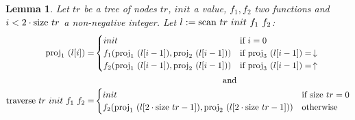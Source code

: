 \documentclass{article}
\newtheorem{lemma}{Lemma}
\newcommand{\textfun}[1]{\textup{#1}}
\newcommand{\longtraverse}[4]{\textfun{traverse}\ #1\ #2\ #3 \ #4}
\newcommand{\longscan}[4]{\textfun{scan}\ #1\ #2\ #3 \ #4}
\newcommand{\up}{\uparrow}
\newcommand{\down}{\downarrow}
\newcommand{\size}[1]{\textfun{size}\ #1}
\newcommand{\fst}[1]{\textfun{proj}_1\ #1}
\newcommand{\snd}[1]{\textfun{proj}_2\ #1}
\newcommand{\trd}[1]{\textfun{proj}_3\ #1}
\begin{document}
\begin{lemma}
    \label{scan_indexing_state}
    Let $tr$ be a tree of nodes $tr$, $init$ a value, $f_1, f_2$ two functions and $i < 2 \cdot \size{tr}$ a non-negative integer. Let $l := \longscan{tr}{init}{f_1}{f_2}$:
    \begin{align}
    \fst{(l[i])} =& \begin{cases}
        init & \text{if $i = 0$}\\
        f_1(\fst{(l[i - 1])}, \snd{(l[i - 1])}) & \text{if $\trd{(l[i - 1])} = \, \down$} \\
        f_2(\fst{(l[i - 1])}, \snd{(l[i - 1])}) & \text{if $\trd{(l[i - 1])} = \, \up$}
    \end{cases}\\
    \intertext{\hskip 25em and}
    \longtraverse{tr}{init}{f_1}{f_2} =& 
        \begin{cases}
        init &\text{if $\size{tr} = 0$} \\
        f_2(\fst{(l[2 \cdot \size{tr} - 1])}, \snd{(l[2 \cdot \size{tr} - 1])}) &\text{otherwise}
        \end{cases}
    \end{align}
\end{lemma}
\end{document}
